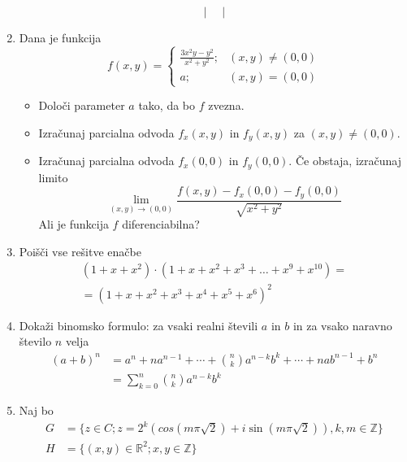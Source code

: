 \documentclass[a4paper,12pt]{article}
\begin{document}
\begin{enumerate}
{\[\begin{vmatrix}
        \end{vmatrix}
        \]
    }

    \item {
        Dana je funkcija
        \[
            f(x,y)= 
            \begin{cases}
                \frac{3x^2y-y^2}{x^2+y^2}; & (x,y) \neq (0,0)\\
                a ; & (x,y) = (0,0)
            \end{cases}
        \]
        \begin{itemize}
            \item Določi parameter $a$ tako, da bo $f$ zvezna.
            \item Izračunaj parcialna odvoda $f_x(x,y)$ in $f_y(x,y)$ za $(x,y) \neq (0,0)$.
            \item {
                Izračunaj parcialna odvoda $f_x(0,0)$ in $f_y(0,0)$.
                Če obstaja, izračunaj limito
                \[
                    \lim_{(x,y) \rightarrow (0,0)} \frac{f(x,y) - f_x(0,0) - f_y(0,0)}{\sqrt{x^2 + y^2}}
                \]
                Ali je funkcija $f$ diferenciabilna?
            }
        \end{itemize}
    }

    \item {
        Poišči vse rešitve enačbe
        \begin{align*}
        (1 + x+x^2)\cdot(1+x+x^2+x^3+\dots+x^9+x^{10}) = \\
            = (1+x+x^2+x^3+x^4+x^5+x^6)^2 
        \end{align*}
    }

    \item {
        Dokaži binomsko formulo: za vsaki realni števili $a$ in $b$ in za vsako naravno število $n$ velja
        \begin{align} 
            (a + b)^n &= a^n + na^{n-1} + \cdots + \binom{n}{k}a^{n-k}b^k + \cdots + nab^{n-1} + b^n \nonumber \\
                &= \sum_{k=0}^n\binom{n}{k}a^{n-k}b^k \nonumber
        \end{align}
    }

    \item {
        Naj bo
        \begin{align}
            G &= \{z \in C; z = 2^k(cos(m\pi\sqrt{2}) + i\sin(m\pi\sqrt{2})),k,m \in \mathbb{Z}\} \nonumber \\
            H &= \{(x,y) \in \mathbb{R}^2;x,y \in \mathbb{Z}\} \nonumber
        \end{align}

}
\end{enumerate}
\end{document}
